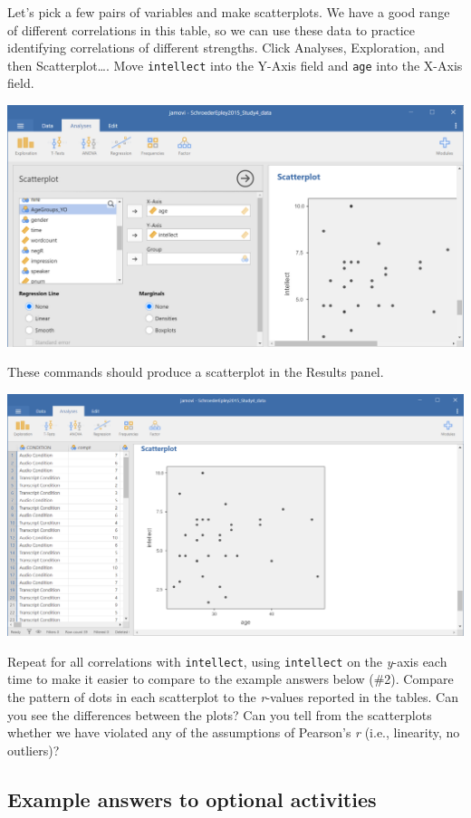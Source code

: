 \documentclass[
]{book}
\begin{document}
Let's pick a few pairs of variables and make scatterplots. We have a good range of different correlations in this table, so we can use these data to practice identifying correlations of different strengths. Click {Analyses}, {Exploration}, and then {Scatterplot\ldots{}}. Move \texttt{intellect} into the Y-Axis field and \texttt{age} into the X-Axis field.

\includegraphics{img/7.4.68.png}

These commands should produce a scatterplot in the Results panel.

\includegraphics{img/7.4.69.png}

Repeat for all correlations with \texttt{intellect}, using \texttt{intellect} on the \emph{y}-axis each time to make it easier to compare to the example answers below (\#2). Compare the pattern of dots in each scatterplot to the \emph{r}-values reported in the tables. Can you see the differences between the plots? Can you tell from the scatterplots whether we have violated any of the assumptions of Pearson's \emph{r} (i.e., linearity, no outliers)?

\hypertarget{example-answers-to-optional-activities-2}{%
\subsection{Example answers to optional activities}\label{example-answers-to-optional-activities-2}}
\end{document}

